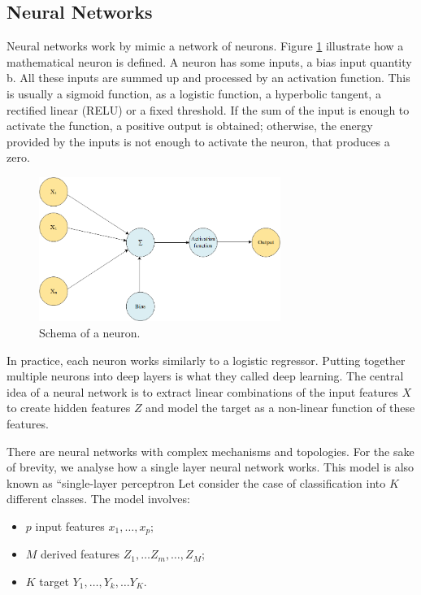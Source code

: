 \subsection{Neural Networks}
Neural networks work by mimic a network of neurons. Figure \ref{fig_neuron} illustrate how a mathematical neuron is defined. A neuron has some inputs, a bias input quantity b. All these inputs are summed up and processed by an activation function. This is usually a sigmoid function, as a logistic function, a hyperbolic tangent, a rectified linear (RELU) or a fixed threshold. If the sum of the input is enough to activate the function, a positive output is obtained; otherwise, the energy provided by the inputs is not enough to activate the neuron, that produces a zero.

\begin{figure}[hbt!]
\centering
\includegraphics[width=0.7\textwidth]{SectionLetsMath/nonLinearMethods_fig/fig_neuron.png}
\captionsetup{type=figure}
\caption{Schema of a neuron.}
\label{fig_neuron}
\end{figure}

In practice, each neuron works similarly to a logistic regressor. Putting together multiple neurons into deep layers is what they called deep learning. The central idea of a neural network is to extract linear combinations of the input features $X$ to create hidden features $Z$ and model the target as a non-linear function of these features. \par

There are neural networks with complex mechanisms and topologies. For the sake of brevity, we analyse how a single layer neural network works. This model is also known as “single-layer perceptron Let consider the case of classification into $K$ different classes. The model involves:

\begin{itemize}
    \item $p$ input features $x_1,\ldots,x_p$;
    \item $M$ derived features $Z_1,\ldots Z_m,\ldots,Z_M$;
    \item $K$ target $Y_1,\ldots,Y_k,\ldots Y_K$.
\end{itemize}

